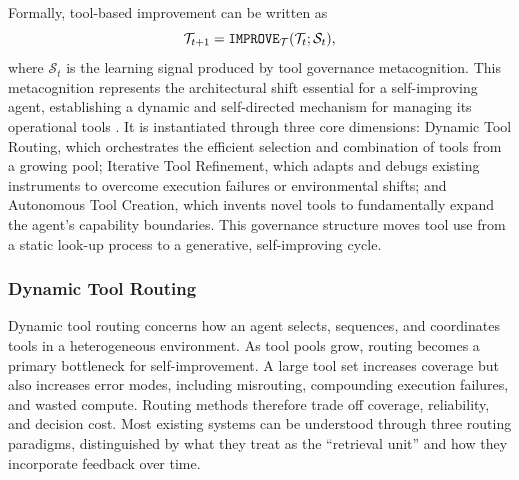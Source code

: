 Formally, tool-based improvement can be written as
\begin{equation}
\mathcal{T}_{t+1}=\operatorname{\mathtt{IMPROVE}}_{\mathcal{T}}(\mathcal{T}_t;\mathcal{S}_t),
\end{equation}
where $\mathcal{S}_t$ is the learning signal produced by tool governance metacognition. This metacognition represents the architectural shift essential for a self-improving agent, establishing a dynamic and self-directed mechanism for managing its operational tools \citep{wang2025theoryagentstoolusedecisionmakers}. It is instantiated through three core dimensions: Dynamic Tool Routing, which orchestrates the efficient selection and combination of tools from a growing pool; Iterative Tool Refinement, which adapts and debugs existing instruments to overcome execution failures or environmental shifts; and Autonomous Tool Creation, which invents novel tools to fundamentally expand the agent's capability boundaries. This governance structure moves tool use from a static look-up process to a generative, self-improving cycle.


\subsubsection{Dynamic Tool Routing}
\label{sec:Dynamic_Tool_Routing}

Dynamic tool routing concerns how an agent selects, sequences, and coordinates tools in a heterogeneous environment. As tool pools grow, routing becomes a primary bottleneck for self-improvement. A large tool set increases coverage but also increases error modes, including misrouting, compounding execution failures, and wasted compute. Routing methods therefore trade off coverage, reliability, and decision cost. Most existing systems can be understood through three routing paradigms, distinguished by what they treat as the ``retrieval unit'' and how they incorporate feedback over time.



